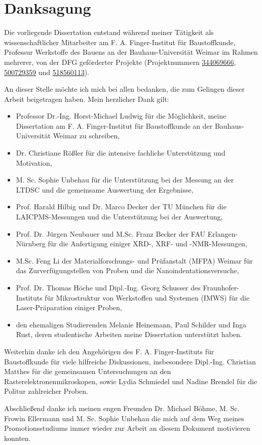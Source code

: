 \chapter*{Danksagung}
Die vorliegende Dissertation entstand während meiner Tätigkeit als wissenschaftlicher Mitarbeiter
am F. A. Finger-Institut für Baustoffkunde, Professur Werkstoffe des Bauens an der Bauhaus-Universität Weimar im Rahmen mehrerer, von der DFG geförderter Projekte (Projektnummern \href{https://gepris.dfg.de/gepris/projekt/344069666}{344069666}, \href{https://gepris.dfg.de/gepris/projekt/500729359}{500729359} und \href{https://gepris.dfg.de/gepris/projekt/518560113}{518560113}).

An dieser Stelle möchte ich mich bei allen bedanken, die zum Gelingen dieser Arbeit beigetragen haben.
Mein herzlicher Dank gilt:

\begin{itemize}
    \item Professor Dr.-Ing. Horst-Michael Ludwig für die Möglichkeit, meine Dissertation am F. A. Finger-Institut für Baustoffkunde an der Bauhaus-Universität Weimar zu schreiben,
    \item Dr. Christiane Rößler für die intensive fachliche Unterstützung und Motivation,
    \item M. Sc. Sophie Unbehau für die Unterstützung bei der Messung an der \acs*{LTDSC} und die gemeinsame Auswertung der Ergebnisse,
    \item Prof. Harald Hilbig und Dr. Marco Decker der TU München für die \acs*{LAICPMS}-Messungen und die Unterstützung bei der Auswertung,
    \item Prof. Dr. Jürgen Neubauer und M.Sc. Franz Becker der FAU Erlangen-Nürnberg für die Anfertigung einiger \acs*{XRD}-, \acs*{XRF}- und -NMR-Messungen,
    \item M.Sc. Feng Li der Materialforschungs- und Prüfanstalt (MFPA) Weimar für das Zurverfügungstellen von Proben und die Nanoindentationsversuche,
    \item Prof. Dr. Thomas Höche und Dipl.-Ing. Georg Schusser des Fraunhofer-Instituts für Mikrostruktur von Werkstoffen und Systemen (IMWS) für die Laser-Prä\-pa\-ra\-ti\-on einiger Proben,
    \item den ehemaligen Studierenden Melanie Heinemann, Paul Schilder und Inga Rust, deren studentische Arbeiten meine Dissertation unterstützt haben.
\end{itemize}

Weiterhin danke ich den Angehörigen des F. A. Finger-Instituts für Baustoffkunde für viele hilfreiche Diskussionen, insbesondere Dipl.-Ing. Christian Matthes für die gemeinsamen Untersuchungen an den Rasterelektronenmikroskopen, sowie Lydia Schmiedel und Nadine Brendel für die Politur zahlreicher Proben.

Abschließend danke ich meinen engen Freunden Dr. Michael Böhme, M. Sc. Frowin Ellermann und M. Sc. Sophie Unbehau die mich auf dem Weg meines Promotionsstudiums immer wieder zur Arbeit an diesem Dokument motivieren konnten.
